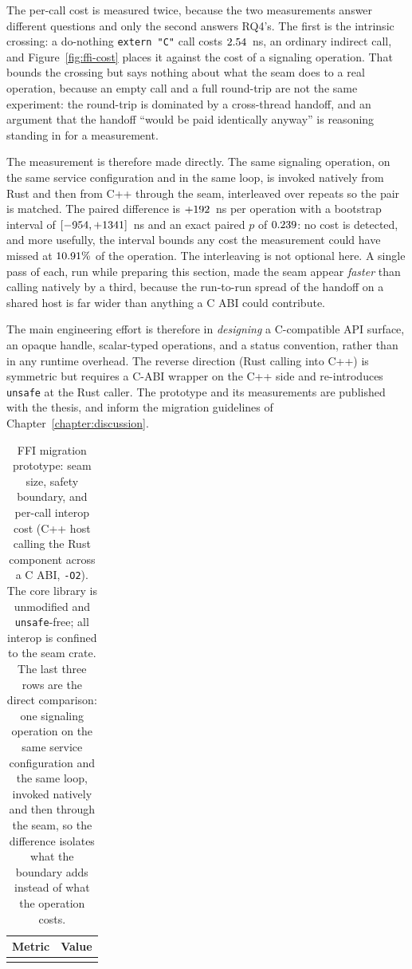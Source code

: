\documentclass[english,twoside,openright,a4paper,censored,csm,software-track-2020]{HYthesisML}
\begin{document}
The per-call cost is measured twice, because the two measurements answer different questions
and only the second answers RQ4's. The first is the intrinsic crossing: a do-nothing
\texttt{extern "C"} call costs $2.54$~ns, an ordinary indirect call, and
Figure~\ref{fig:ffi-cost} places it against the cost of a signaling operation. That bounds the
crossing but says nothing about what the seam does to a real operation, because an empty call
and a full round-trip are not the same experiment: the round-trip is dominated by a
cross-thread handoff, and an argument that the handoff ``would be paid identically anyway'' is
reasoning standing in for a measurement.

The measurement is therefore made directly. The same signaling operation, on the same service
configuration and in the same loop, is invoked natively from Rust and then from C++ through the
seam, interleaved over \FfiOpRepeats{} repeats so the pair is matched. The paired difference is
$+192$~ns per operation with a bootstrap interval of $[-954, +1341]$~ns
and an exact paired $p$ of $0.239$: no cost is detected, and more usefully, the interval
bounds any cost the measurement could have missed at $10.91\%$ of the operation. The
interleaving is not optional here. A single pass of each, run while preparing this section,
made the seam appear \emph{faster} than calling natively by a third, because the run-to-run
spread of the handoff on a shared host is far wider than anything a C ABI could contribute.

The main engineering effort is therefore in \emph{designing} a C-compatible API
surface, an opaque handle, scalar-typed operations, and a status convention, rather than in
any runtime overhead. The reverse direction (Rust calling into C++) is symmetric but requires
a C-ABI wrapper on the C++ side and re-introduces \texttt{unsafe} at the Rust caller. The
prototype and its measurements are published with the thesis, and inform the migration
guidelines of Chapter~\ref{chapter:discussion}.

\begin{table}
\centering
\caption[FFI migration prototype: seam size, safety, and cost]{FFI migration prototype: seam size, safety boundary, and per-call interop cost
(C++ host calling the Rust component across a C ABI, \texttt{-O2}). The core library is
unmodified and \texttt{unsafe}-free; all interop is confined to the seam crate. The last
three rows are the direct comparison: one signaling operation on the same service
configuration and the same loop, invoked natively and then through the seam, so the
difference isolates what the boundary adds instead of what the operation
costs.\label{tab:ffi}}
\begin{tabular}{l r}
\hline\hline
Metric & Value \\
\hline
\\
\hline
\end{tabular}
\end{table}
\end{document}
